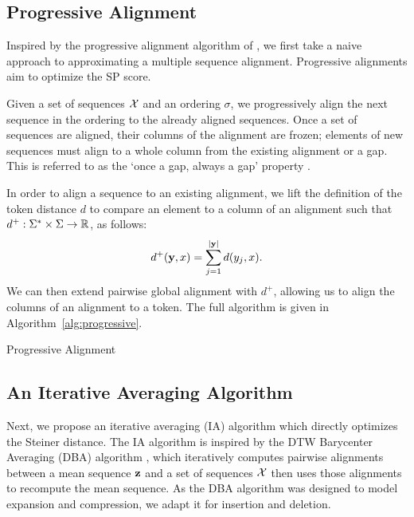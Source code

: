 \documentclass{article}
\begin{document}
\subsection{Progressive Alignment}
Inspired by the progressive alignment algorithm
of \citet{fengdoolittle}, we first take a naive approach to approximating
a multiple sequence alignment.
Progressive alignments aim to optimize the SP score.

Given a set of sequences $\mathcal{X}$ and an ordering $\sigma$,
we progressively align the next sequence in the ordering to the
already aligned sequences.
Once a set of sequences are aligned, their columns of the alignment are frozen;
elements of new sequences must align to a whole column
from the existing alignment or a gap.
This is referred to as the `once a gap, always a gap' property \citep{fengdoolittle}.

In order to align a sequence to an existing alignment, we lift the definition of
the token distance $d$ to compare an element to a column of an alignment 
such that $d^+: \Sigma^*\times\Sigma\to\mathbb{R}$, as follows:
\begin{equation}
\label{eqn:dplus}
d^+(\mathbf{y}, x) = \sum_{j=1}^{|\mathbf{y}|} d(y_j, x).
\end{equation}
We can then extend pairwise global alignment with $d^+$, allowing us to
align the columns of an alignment to a token.
The full algorithm is given in Algorithm~\ref{alg:progressive}.

\begin{algorithm}[h]
\begin{algorithmic}
\EndFor
{}
\end{algorithmic}
\caption{\label{alg:progressive}
Progressive Alignment
}
\end{algorithm}

\subsection{An Iterative Averaging Algorithm}
Next, we propose an iterative averaging (IA)
algorithm which directly optimizes the Steiner distance.
The IA algorithm is inspired by the
DTW Barycenter Averaging (DBA) algorithm \citep{petitjean2011dba},
which iteratively computes pairwise alignments between a mean sequence $\mathbf{z}$
and a set of sequences $\mathcal{X}$ then uses those alignments to recompute the mean sequence. 
As the DBA algorithm was designed to model expansion and compression, 
we adapt it for insertion and deletion.
\end{document}

